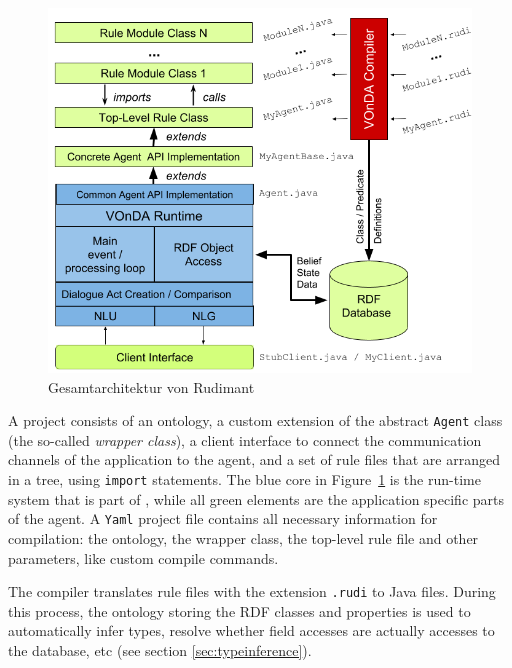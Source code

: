 \begin{figure}[htbp]
  \centering
  \includegraphics[width=.8\textwidth]{VOnDAStructureRot2.png}
  \caption{Gesamtarchitektur von Rudimant}
  \label{fig:architecture}
\end{figure}


A \vonda project consists of an ontology, a custom extension of the abstract
\texttt{Agent} class (the so-called \emph{wrapper class}), a client interface
to connect the communication channels of the application to the agent, and a
set of rule files that are arranged in a tree, using \texttt{import}
statements. The blue core in Figure~\ref{fig:architecture} is the run-time system that
is part of \vonda, while all green elements are the application specific parts
of the agent. A \texttt{Yaml} project file contains all necessary information
for compilation: the ontology, the wrapper class, the top-level rule file and
other parameters, like custom compile commands.

The \vonda compiler translates rule files with the extension \texttt{.rudi} to Java files. During this process, the ontology storing the RDF classes and properties is used to automatically infer types, resolve whether field accesses are actually accesses to the database, etc (see section \ref{sec:typeinference}).

